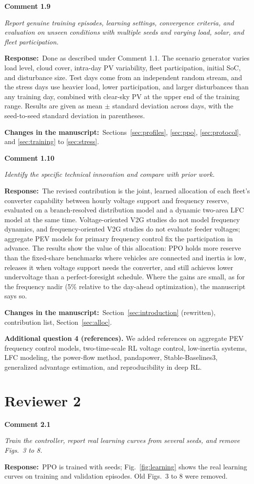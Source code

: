 \documentclass[10pt,a4paper]{article}
\newcommand{\rc}[1]{\par\noindent\textbf{Comment #1}\par}
\newcommand{\resp}{\par\noindent\textbf{Response:}\ }
\newcommand{\chg}{\par\noindent\textbf{Changes in the manuscript:}\ }
\begin{document}
\rc{1.9} \emph{Report genuine training episodes, learning settings,
convergence criteria, and evaluation on unseen conditions with multiple
seeds and varying load, solar, and fleet participation.}
\resp Done as described under Comment 1.1. The scenario generator
varies load level, cloud cover, intra-day PV variability, fleet
participation, initial SoC, and disturbance size. Test days come from
an independent random stream, and the stress days use heavier load, lower
participation, and larger disturbances than any training day, combined
with clear-sky PV at the upper end of the training range. Results are given as mean $\pm$ standard deviation across
days, with the seed-to-seed standard deviation in parentheses.
\chg Sections~\ref{sec:profiles}, \ref{sec:ppo}, \ref{sec:protocol}, and \ref{sec:training} to \ref{sec:stress}.

\rc{1.10} \emph{Identify the specific technical innovation and compare
with prior work.}
\resp The revised contribution is the joint, learned allocation of
each fleet's converter capability between hourly voltage support and
frequency reserve, evaluated on a branch-resolved distribution model
and a dynamic two-area LFC model at the same time. Voltage-oriented
V2G studies do not model frequency dynamics, and frequency-oriented
V2G studies do not evaluate feeder voltages; aggregate PEV models for
primary frequency control fix the participation in advance. The
results show the value of this allocation: PPO holds more reserve than
the fixed-share benchmarks where vehicles are connected and inertia is
low, releases it when voltage support needs the converter, and still
achieves lower undervoltage than a perfect-foresight schedule.
Where the gains are small, as for the frequency nadir (5\% relative to
the day-ahead optimization), the manuscript says so.
\chg Section~\ref{sec:introduction} (rewritten), contribution list, Section~\ref{sec:alloc}.

\textbf{Additional question 4 (references).} We added references on
aggregate PEV frequency control models, two-time-scale RL voltage
control, low-inertia systems, LFC modeling, the power-flow method,
pandapower, Stable-Baselines3, generalized advantage estimation, and
reproducibility in deep RL.

\section*{Reviewer 2}

\rc{2.1} \emph{Train the controller, report real learning curves from
several seeds, and remove Figs.~3 to 8.}
\resp PPO is trained with \NSeed{} seeds; Fig.~\ref{fig:learning} shows the real
learning curves on training and validation episodes. Old Figs.~3 to 8
were removed.
\end{document}
